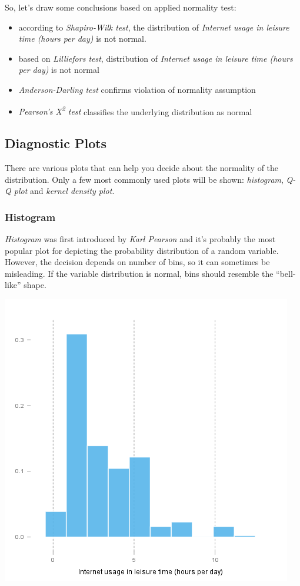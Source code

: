 \documentclass[]{article}
\makeatletter
\def\maxwidth{\ifdim\Gin@nat@width>\linewidth\linewidth
\else\Gin@nat@width\fi}
\let\Oldincludegraphics\includegraphics
\renewcommand{\includegraphics}[1]{\Oldincludegraphics[width=\maxwidth]{#1}}
\makeatother
\begin{document}
So, let's draw some conclusions based on applied normality test:

\begin{itemize}
\item
  according to \emph{Shapiro-Wilk test}, the distribution of
  \emph{Internet usage in leisure time (hours per day)} is not normal.
\item
  based on \emph{Lilliefors test}, distribution of \emph{Internet usage
  in leisure time (hours per day)} is not normal
\item
  \emph{Anderson-Darling test} confirms violation of normality
  assumption
\item
  \emph{Pearson's Χ\textsuperscript{2} test} classifies the underlying
  distribution as normal
\end{itemize}
\subsection{Diagnostic Plots}

There are various plots that can help you decide about the normality of
the distribution. Only a few most commonly used plots will be shown:
\emph{histogram}, \emph{Q-Q plot} and \emph{kernel density plot}.

\subsubsection{Histogram}

\emph{Histogram} was first introduced by \emph{Karl Pearson} and it's
probably the most popular plot for depicting the probability
distribution of a random variable. However, the decision depends on
number of bins, so it can sometimes be misleading. If the variable
distribution is normal, bins should resemble the ``bell-like'' shape.

\href{a949c4cf7eda15cd079e9d63b81acdd4-hires.png}{\includegraphics{a949c4cf7eda15cd079e9d63b81acdd4.png}}
\end{document}
